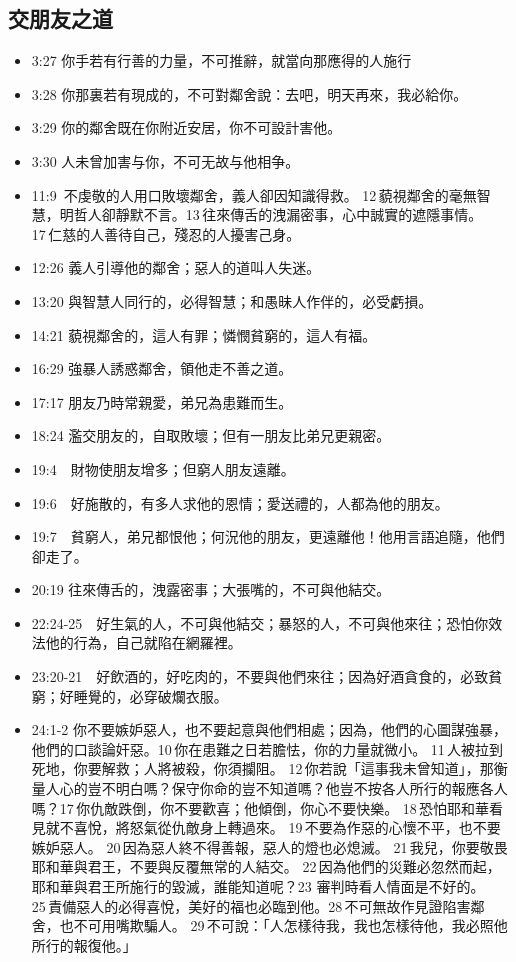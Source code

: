 \subsection{交朋友之道}
\begin{itemize}
\itemsep-.45em 
\item 3:27 你手若有行善的力量，不可推辭，就當向那應得的人施行
\item 3:28 你那裏若有現成的，不可對鄰舍說：去吧，明天再來，我必給你。
\item 3:29 你的鄰舍既在你附近安居，你不可設計害他。
\item 3:30 人未曾加害与你，不可无故与他相争。
\item 11:9  不虔敬的人用口敗壞鄰舍，義人卻因知識得救。 12 藐視鄰舍的毫無智慧，明哲人卻靜默不言。13 往來傳舌的洩漏密事，心中誠實的遮隱事情。17 仁慈的人善待自己，殘忍的人擾害己身。
\item 12:26 義人引導他的鄰舍；惡人的道叫人失迷。
\item 13:20 與智慧人同行的，必得智慧；和愚昧人作伴的，必受虧損。
\item 14:21 藐視鄰舍的，這人有罪；憐憫貧窮的，這人有福。
\item 16:29 強暴人誘惑鄰舍，領他走不善之道。
\item 17:17 朋友乃時常親愛，弟兄為患難而生。
\item 18:24 濫交朋友的，自取敗壞；但有一朋友比弟兄更親密。
\item 19:4　財物使朋友增多；但窮人朋友遠離。
\item 19:6　好施散的，有多人求他的恩情；愛送禮的，人都為他的朋友。
\item 19:7　貧窮人，弟兄都恨他；何況他的朋友，更遠離他！他用言語追隨，他們卻走了。
\item 20:19 往來傳舌的，洩露密事；大張嘴的，不可與他結交。
\item 22:24-25　好生氣的人，不可與他結交；暴怒的人，不可與他來往；恐怕你效法他的行為，自己就陷在網羅裡。
\item 23:20-21　好飲酒的，好吃肉的，不要與他們來往；因為好酒貪食的，必致貧窮；好睡覺的，必穿破爛衣服。
\item 24:1-2 你不要嫉妒惡人，也不要起意與他們相處；因為，他們的心圖謀強暴，他們的口談論奸惡。10 你在患難之日若膽怯，你的力量就微小。 11 人被拉到死地，你要解救；人將被殺，你須攔阻。 12 你若說「這事我未曾知道」，那衡量人心的豈不明白嗎？保守你命的豈不知道嗎？他豈不按各人所行的報應各人嗎？17 你仇敵跌倒，你不要歡喜；他傾倒，你心不要快樂。 18 恐怕耶和華看見就不喜悅，將怒氣從仇敵身上轉過來。 19 不要為作惡的心懷不平，也不要嫉妒惡人。 20 因為惡人終不得善報，惡人的燈也必熄滅。 21 我兒，你要敬畏耶和華與君王，不要與反覆無常的人結交。 22 因為他們的災難必忽然而起，耶和華與君王所施行的毀滅，誰能知道呢？23 審判時看人情面是不好的。25 責備惡人的必得喜悅，美好的福也必臨到他。28 不可無故作見證陷害鄰舍，也不可用嘴欺騙人。 29 不可說：「人怎樣待我，我也怎樣待他，我必照他所行的報復他。」

\end{itemize}
